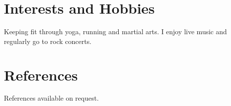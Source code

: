 \documentclass[11pt,a4paper,sans]{moderncv}
\begin{document}
\section{Interests and Hobbies}
Keeping fit through yoga, running and martial arts.  I enjoy live music and regularly go to rock concerts.  




\section{References}
References available on request.

\nocite{*}
\newpage

               
\end{document}
